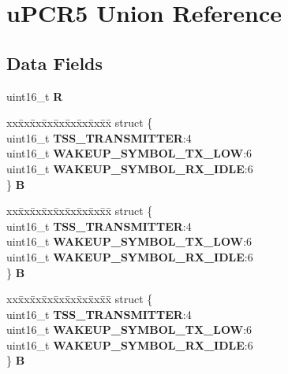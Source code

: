 \hypertarget{unionuPCR5}{}\section{u\+P\+C\+R5 Union Reference}
\label{unionuPCR5}
\subsection*{Data Fields}
\begin{DoxyCompactItemize}
\item 
\mbox{\label{unionuPCR5_a71e2573e6ef1d7890913da0f784d11e8}} 
uint16\+\_\+t {\bfseries R}
\item 
\mbox{\label{unionuPCR5_abbbf1474059208b059cb827d7989ccf9}} 
\begin{tabbing}
xx\=xx\=xx\=xx\=xx\=xx\=xx\=xx\=xx\=\kill
struct \{\\
\>uint16\_t {\bfseries TSS\_TRANSMITTER}:4\\
\>uint16\_t {\bfseries WAKEUP\_SYMBOL\_TX\_LOW}:6\\
\>uint16\_t {\bfseries WAKEUP\_SYMBOL\_RX\_IDLE}:6\\
\} {\bfseries B}\\

\end{tabbing}\item 
\mbox{\label{unionuPCR5_adb0e36d0d8abea3a21d687730329cfae}} 
\begin{tabbing}
xx\=xx\=xx\=xx\=xx\=xx\=xx\=xx\=xx\=\kill
struct \{\\
\>uint16\_t {\bfseries TSS\_TRANSMITTER}:4\\
\>uint16\_t {\bfseries WAKEUP\_SYMBOL\_TX\_LOW}:6\\
\>uint16\_t {\bfseries WAKEUP\_SYMBOL\_RX\_IDLE}:6\\
\} {\bfseries B}\\

\end{tabbing}\item 
\mbox{\label{unionuPCR5_ac4047df84ebc3d8689a322e81fb74544}} 
\begin{tabbing}
xx\=xx\=xx\=xx\=xx\=xx\=xx\=xx\=xx\=\kill
struct \{\\
\>uint16\_t {\bfseries TSS\_TRANSMITTER}:4\\
\>uint16\_t {\bfseries WAKEUP\_SYMBOL\_TX\_LOW}:6\\
\>uint16\_t {\bfseries WAKEUP\_SYMBOL\_RX\_IDLE}:6\\
\} {\bfseries B}\\


\end{tabbing}
\end{DoxyCompactItemize}
